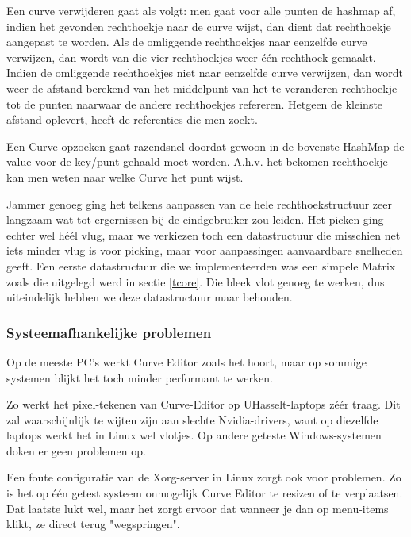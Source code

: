 \documentclass[a4paper,11pt,oneside, titlepage]{article}
\begin{document}
Een curve verwijderen gaat als volgt: men gaat voor alle punten de hashmap af, indien het gevonden rechthoekje naar de curve wijst, dan dient dat rechthoekje aangepast te worden. Als de omliggende rechthoekjes naar eenzelfde curve verwijzen, dan wordt van die vier rechthoekjes weer één rechthoek gemaakt. Indien de omliggende rechthoekjes niet naar eenzelfde curve verwijzen, dan wordt weer de afstand berekend van het middelpunt van het te veranderen rechthoekje tot de punten naarwaar de andere rechthoekjes refereren. Hetgeen de kleinste afstand oplevert, heeft de referenties die men zoekt. 

Een Curve opzoeken gaat razendsnel doordat gewoon in de bovenste HashMap de value voor de key/punt gehaald moet worden. 
A.h.v. het bekomen rechthoekje kan men weten naar welke Curve het punt wijst.

Jammer genoeg ging het telkens aanpassen van de hele rechthoekstructuur zeer langzaam wat tot ergernissen bij de eindgebruiker zou leiden. Het picken ging echter wel h\'e\'el vlug, maar we verkiezen toch een datastructuur die misschien net iets minder vlug is voor picking, maar voor aanpassingen aanvaardbare snelheden geeft.
Een eerste datastructuur die we implementeerden was een simpele Matrix zoals die uitgelegd werd in sectie \ref{tcore}. Die bleek vlot genoeg te werken, dus uiteindelijk hebben we deze datastructuur maar behouden.
\subsubsection{Systeemafhankelijke problemen}
Op de meeste PC's werkt Curve Editor zoals het hoort, maar op sommige systemen blijkt het toch minder performant te werken.

Zo werkt het pixel-tekenen van Curve-Editor op UHasselt-laptops z\'e\'er traag. Dit zal waarschijnlijk te wijten zijn aan slechte Nvidia-drivers, want op diezelfde laptops werkt het in Linux wel vlotjes.
Op andere geteste Windows-systemen doken er geen problemen op.

Een foute configuratie van de Xorg-server in Linux zorgt ook voor problemen. Zo is het op \'e\'en getest systeem onmogelijk Curve Editor te resizen of te verplaatsen. Dat laatste lukt wel, maar het zorgt ervoor dat 
wanneer je dan op menu-items klikt, ze direct terug "wegspringen".
\newpage
\end{document}
